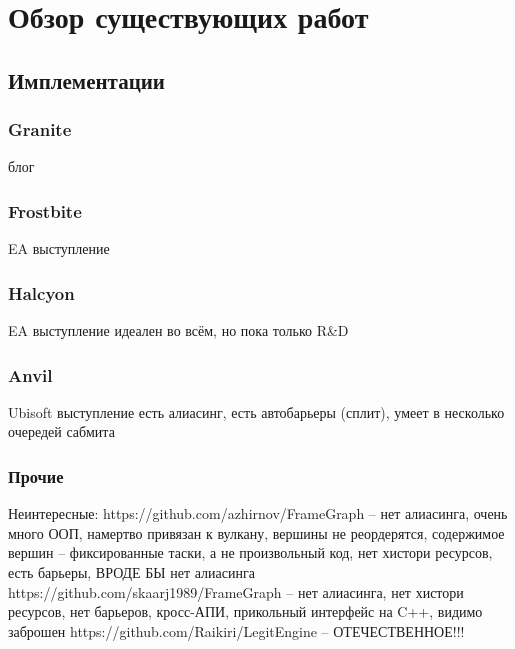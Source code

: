 \section{Обзор существующих работ}
\subsection{Имплементации}
\subsubsection*{Granite\cite{Granite}}
блог\cite{GraniteBlogPost}

\subsubsection*{Frostbite}
EA выступление\cite{FrostbiteGdcTalk}

\subsubsection*{Halcyon}
EA выступление\cite{HalcyonRapidInnovationTalk}
идеален во всём, но пока только R\&D

\subsubsection*{Anvil}
Ubisoft выступление\cite{DX12CaseStudies}
есть алиасинг, есть автобарьеры (сплит), умеет в несколько очередей сабмита

\subsubsection*{Прочие}
Неинтересные:
https://github.com/azhirnov/FrameGraph -- нет алиасинга, очень много ООП, намертво привязан к вулкану, вершины не реордерятся, содержимое вершин -- фиксированные таски, а не произвольный код, нет хистори ресурсов, есть барьеры, ВРОДЕ БЫ нет алиасинга
https://github.com/skaarj1989/FrameGraph -- нет алиасинга, нет хистори ресурсов, нет барьеров, кросс-АПИ, прикольный интерфейс на C++, видимо заброшен
https://github.com/Raikiri/LegitEngine -- ОТЕЧЕСТВЕННОЕ!!!
